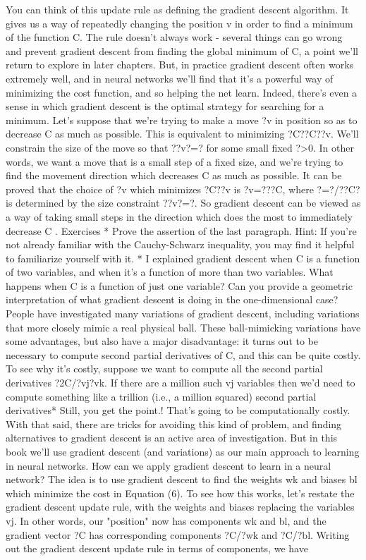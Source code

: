 You can think of this update rule as defining the gradient descent algorithm. It gives us a way of repeatedly changing the position v in order to find a minimum of the function C. The rule doesn't always work - several things can go wrong and prevent gradient descent from finding the global minimum of C, a point we'll return to explore in later chapters. But, in practice gradient descent often works extremely well, and in neural networks we'll find that it's a powerful way of minimizing the cost function, and so helping the net learn.
Indeed, there's even a sense in which gradient descent is the optimal strategy for searching for a minimum. Let's suppose that we're trying to make a move ?v in position so as to decrease C as much as possible. This is equivalent to minimizing ?C??C??v. We'll constrain the size of the move so that ??v?=? for some small fixed ?>0. In other words, we want a move that is a small step of a fixed size, and we're trying to find the movement direction which decreases C as much as possible. It can be proved that the choice of ?v which minimizes ?C??v is ?v=???C, where ?=?/??C? is determined by the size constraint ??v?=?. So gradient descent can be viewed as a way of taking small steps in the direction which does the most to immediately decrease C
.
Exercises
* Prove the assertion of the last paragraph. Hint: If you're not already familiar with the Cauchy-Schwarz inequality, you may find it helpful to familiarize yourself with it.
* I explained gradient descent when C is a function of two variables, and when it's a function of more than two variables. What happens when C is a function of just one variable? Can you provide a geometric interpretation of what gradient descent is doing in the one-dimensional case? 
People have investigated many variations of gradient descent, including variations that more closely mimic a real physical ball. These ball-mimicking variations have some advantages, but also have a major disadvantage: it turns out to be necessary to compute second partial derivatives of C, and this can be quite costly. To see why it's costly, suppose we want to compute all the second partial derivatives ?2C/?vj?vk. If there are a million such vj variables then we'd need to compute something like a trillion (i.e., a million squared) second partial derivatives* 
Still, you get the point.! That's going to be computationally costly. With that said, there are tricks for avoiding this kind of problem, and finding alternatives to gradient descent is an active area of investigation. But in this book we'll use gradient descent (and variations) as our main approach to learning in neural networks.
How can we apply gradient descent to learn in a neural network? The idea is to use gradient descent to find the weights wk and biases bl which minimize the cost in Equation (6). To see how this works, let's restate the gradient descent update rule, with the weights and biases replacing the variables vj. In other words, our "position" now has components wk and bl, and the gradient vector ?C has corresponding components ?C/?wk and ?C/?bl. Writing out the gradient descent update rule in terms of components, we have 

